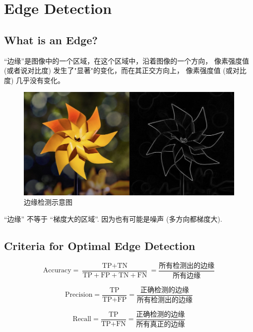 \chapter{Edge Detection}

\section{What is an Edge?}

“边缘”是图像中的一个区域，在这个区域中，沿着图像的一个方向，
像素强度值 (或者说对比度) 发生了"显著"的变化，而在其正交方向上，
像素强度值 (或对比度) 几乎没有变化。

\begin{figure}[htbp]
    \centering
	\includegraphics[scale=0.2]{figures/edge.png}
	\caption{边缘检测示意图}
\end{figure}

“边缘” 不等于 “梯度大的区域”. 因为也有可能是噪声 (多方向都梯度大).

\section{Criteria for Optimal Edge Detection}

\begin{equation}
\text{Accuracy}=\frac{\text{TP}+\text{TN}}{\text{TP}+\text{FP}+\text{TN}+\text{FN}} = \frac{\text{所有检测出的边缘}}{\text{所有边缘}}
\end{equation}

\begin{equation}
\text{Precision}=\frac{\text{TP}}{\text{TP}+\text{FP}} = \frac{\text{正确检测的边缘}}{\text{所有检测出的边缘}}
\end{equation}

\begin{equation}
\text{Recall}=\frac{\text{TP}}{\text{TP}+\text{FN}} = \frac{\text{正确检测的边缘}}{\text{所有真正的边缘}}
\end{equation}

